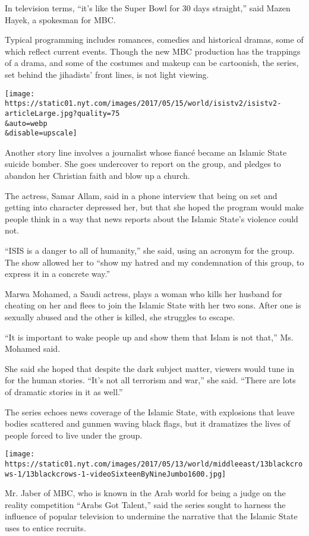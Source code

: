 In television terms, ``it's like the Super Bowl for 30 days straight,''
said Mazen Hayek, a spokesman for MBC.

Typical programming includes romances, comedies and historical dramas,
some of which reflect current events. Though the new MBC production has
the trappings of a drama, and some of the costumes and makeup can be
cartoonish, the series, set behind the jihadists' front lines, is not
light viewing.

\texttt{[image: https://static01.nyt.com/images/2017/05/15/world/isistv2/isistv2-articleLarge.jpg?quality=75\\\&auto=webp\\\&disable=upscale]}

Another story line involves a journalist whose fiancé became an Islamic
State suicide bomber. She goes undercover to report on the group, and
pledges to abandon her Christian faith and blow up a church.

The actress, Samar Allam, said in a phone interview that being on set
and getting into character depressed her, but that she hoped the program
would make people think in a way that news reports about the Islamic
State's violence could not.

``ISIS is a danger to all of humanity,'' she said, using an acronym for
the group. The show allowed her to ``show my hatred and my condemnation
of this group, to express it in a concrete way.''

Marwa Mohamed, a Saudi actress, plays a woman who kills her husband for
cheating on her and flees to join the Islamic State with her two sons.
After one is sexually abused and the other is killed, she struggles to
escape.

``It is important to wake people up and show them that Islam is not
that,'' Ms. Mohamed said.

She said she hoped that despite the dark subject matter, viewers would
tune in for the human stories. ``It's not all terrorism and war,'' she
said. ``There are lots of dramatic stories in it as well.''

The series echoes news coverage of the Islamic State, with explosions
that leave bodies scattered and gunmen waving black flags, but it
dramatizes the lives of people forced to live under the group.

\texttt{[image: https://static01.nyt.com/images/2017/05/13/world/middleeast/13blackcrows-1/13blackcrows-1-videoSixteenByNineJumbo1600.jpg]}

Mr. Jaber of MBC, who is known in the Arab world for being a judge on
the reality competition ``Arabs Got Talent,'' said the series sought to
harness the influence of popular television to undermine the narrative
that the Islamic State uses to entice recruits.

